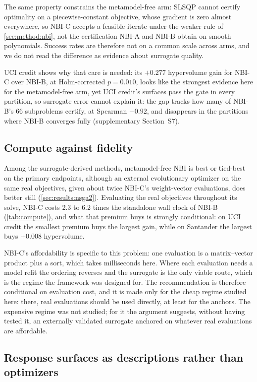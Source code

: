 The same property constrains the metamodel-free arm: SLSQP cannot certify optimality on a piecewise-constant
objective, whose gradient is zero almost everywhere, so NBI-C accepts a feasible iterate under the weaker rule of
\cref{sec:method:nbi}, not the certification NBI-A and NBI-B obtain on smooth polynomials. Success rates are
therefore not on a common scale across arms, and we do not read the difference as evidence about surrogate quality.

UCI credit shows why that care is needed: its $+0.277$ hypervolume gain for NBI-C over NBI-B, at Holm-corrected
$p = 0.010$, looks like the strongest evidence here for the metamodel-free arm, yet UCI credit's surfaces pass the
gate in every partition, so surrogate error cannot explain it: the gap tracks how many of NBI-B's 66 subproblems
certify, at Spearman $-0.92$, and disappears in the partitions where NBI-B converges fully (supplementary
Section~S7).

\subsection{Compute against fidelity}
\label{sec:disc:compute}

Among the surrogate-derived methods, metamodel-free NBI is best or tied-best on the primary endpoints, although an
external evolutionary optimizer on the same real objectives, given about twice NBI-C's weight-vector evaluations,
does better still (\cref{sec:results:nsga2}). Evaluating the real objectives throughout its solve, NBI-C costs 2.3 to
6.2 times the standalone wall clock of NBI-B (\cref{tab:compute}), and what that premium buys is strongly conditional:
on UCI credit the smallest premium buys the largest gain, while on Santander the largest buys $+0.008$ hypervolume.

NBI-C's affordability is specific to this problem: one evaluation is a matrix--vector product plus a sort, which
takes milliseconds here. Where each evaluation needs a model refit the ordering reverses and the surrogate is the only
viable route, which is the regime the framework was designed for. The recommendation is therefore conditional on
evaluation cost, and it is made only for the cheap regime studied here: there, real evaluations should be used
directly, at least for the anchors. The expensive regime was not studied; for it the argument suggests, without
having tested it, an externally validated surrogate anchored on whatever real evaluations are affordable.

\subsection{Response surfaces as descriptions rather than optimizers}
\label{sec:disc:description}

